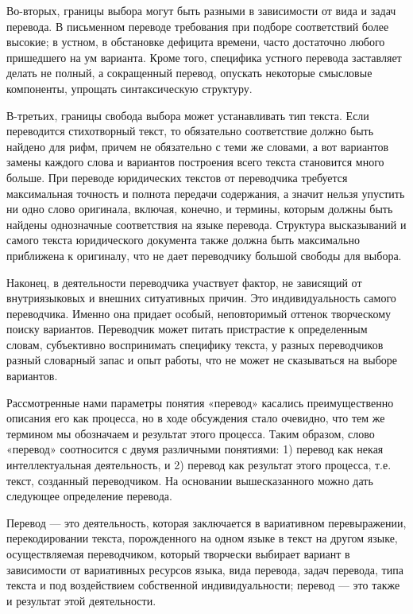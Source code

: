 Во-вторых, границы выбора могут быть разными в зависимости от вида и задач перевода. В письменном переводе требования при подборе соответствий более высокие; в устном, в обстановке дефицита времени, часто достаточно любого пришедшего на ум варианта. Кроме того, специфика устного перевода заставляет делать не полный, а сокращенный перевод, опускать некоторые смысловые компоненты, упрощать синтаксическую структуру.

В-третьих, границы свобода выбора может устанавливать тип текста. Если переводится стихотворный текст, то обязательно соответствие должно быть найдено для рифм, причем не обязательно с теми же словами, а вот вариантов замены каждого слова и вариантов построения всего текста становится много больше. При переводе юридических текстов от переводчика требуется максимальная точность и полнота передачи содержания, а значит нельзя упустить ни одно слово оригинала, включая, конечно, и термины, которым должны быть найдены однозначные соответствия на языке перевода. Структура высказываний и самого текста юридического документа также должна быть максимально приближена к оригиналу, что не дает переводчику большой свободы для выбора.

Наконец, в деятельности переводчика участвует фактор, не зависящий от внутриязыковых и внешних ситуативных причин. Это индивидуальность самого переводчика. Именно она придает особый, неповторимый оттенок творческому поиску вариантов. Переводчик может питать пристрастие к определенным словам, субъективно воспринимать специфику текста, у разных переводчиков разный словарный запас и опыт работы, что не может не сказываться на выборе вариантов. 

Рассмотренные нами параметры понятия «перевод» касались преимущественно описания его как процесса, но в ходе обсуждения стало очевидно, что тем же термином мы обозначаем и результат этого процесса. Таким образом, слово «перевод» соотносится с двумя различными понятиями: 1) перевод как некая интеллектуальная деятельность, и 2) перевод как результат этого процесса, т.е. текст, созданный переводчиком. На основании вышесказанного можно дать следующее определение перевода.

Перевод --- это деятельность, которая заключается в вариативном перевыражении, перекодировании текста, порожденного на одном языке в текст на другом языке, осуществляемая переводчиком, который творчески выбирает вариант в зависимости от вариативных ресурсов языка, вида перевода, задач перевода, типа текста и под воздействием собственной индивидуальности; перевод --- это также и результат этой деятельности.

